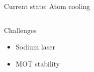\documentclass{beamer}
\begin{document}
\begin{frame}{Current state: Atom cooling}
\begin{columns}[t]
\begin{center}
{
      }
       {
        \begin{block}{Challenges}
          \begin{itemize}
          \item<9-> Sodium laser
          \item<10-> MOT stability
          \end{itemize}
        \end{block}
      }
    \end{center}
  \end{columns}
\end{frame}




\end{document}
